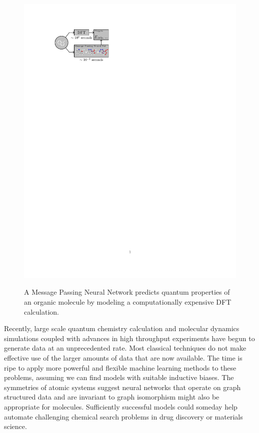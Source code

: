 \documentclass{article}
\begin{document}
\begin{figure}[t!]
\begin{center}
\label{fig:task}
\includegraphics[width=0.95\linewidth]{figure_v2}
\end{center}
\caption{A Message Passing Neural Network predicts quantum properties of an organic molecule by modeling a computationally expensive DFT calculation.}

\end{figure}

Recently, large scale quantum chemistry calculation and molecular dynamics simulations coupled with advances in high throughput experiments have begun to generate data at an unprecedented rate. Most classical techniques do not make effective use of the larger amounts of data that are now available. The time is ripe to apply more powerful and flexible machine learning methods to these problems, assuming we can find models with suitable inductive biases. The symmetries of atomic systems suggest neural networks that operate on graph structured data and are invariant to graph isomorphism might also be appropriate for molecules. Sufficiently successful models could someday help automate challenging chemical search problems in drug discovery or materials science.
\end{document}

